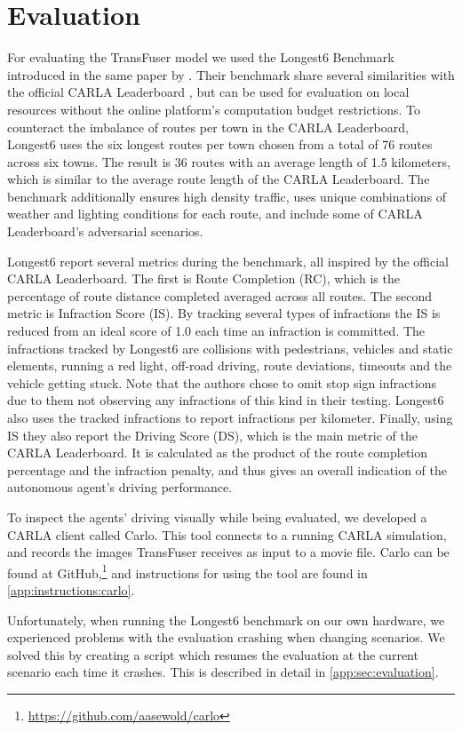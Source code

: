 \section{Evaluation}
\label{sec:evaluation}
For evaluating the TransFuser model we used the Longest6 Benchmark introduced in the same paper by \textcite{transfuser-pami}. Their benchmark share several similarities with the official CARLA Leaderboard \cite{carla-leaderboard}, but can be used for evaluation on local resources without the online platform's computation budget restrictions. To counteract the imbalance of routes per town in the CARLA Leaderboard, Longest6 uses the six longest routes per town chosen from a total of 76 routes across six towns. The result is 36 routes with an average length of 1.5 kilometers, which is similar to the average route length of the CARLA Leaderboard. The benchmark additionally ensures high density traffic, uses unique  combinations of weather and lighting conditions for each route, and include some of CARLA Leaderboard's adversarial scenarios.

Longest6 report several metrics during the benchmark, all inspired by the official CARLA Leaderboard. The first is Route Completion (RC), which is the percentage of route distance completed averaged across all routes. The second metric is Infraction Score (IS). By tracking several types of infractions the IS is reduced from an ideal score of 1.0 each time an infraction is committed. The infractions tracked by Longest6 are collisions with pedestrians, vehicles and static elements, running a red light, off-road driving, route deviations, timeouts and the vehicle getting stuck.
Note that the authors chose to omit stop sign infractions due to them not observing any infractions of this kind in their testing.
Longest6 also uses the tracked infractions to report infractions per kilometer. Finally, using IS they also report the Driving Score (DS), which is the main metric of the CARLA Leaderboard. It is calculated as the product of the route completion percentage and the infraction penalty, and thus gives an overall indication of the autonomous agent's driving performance.

To inspect the agents' driving visually while being evaluated,
we developed a CARLA client called Carlo.
This tool connects to a running CARLA simulation,
and records the images TransFuser receives as input to a movie file.
Carlo can be found at GitHub,\footnote{\url{https://github.com/aasewold/carlo}}
and instructions for using the tool are found in \cref{app:instructions:carlo}.

Unfortunately, when running the Longest6 benchmark on our own hardware, we experienced problems with the evaluation crashing when changing scenarios. We solved this by creating a script which resumes the evaluation at the current scenario each time it crashes. This is described in detail in \cref{app:sec:evaluation}.
